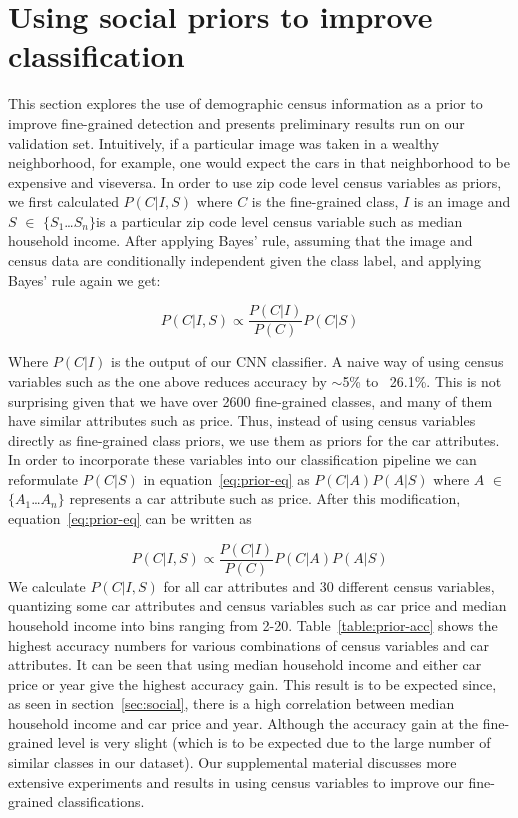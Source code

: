 \documentclass[10pt,twocolumn,letterpaper]{article}
\begin{document}
\section{Using social priors to improve classification}
\label{sec:prior}
This section explores the use of demographic census information as a prior to improve fine-grained detection and presents preliminary results run on our validation set. Intuitively, if a particular image was taken in a wealthy neighborhood, for example, one would expect the cars in that neighborhood to be expensive and viseversa. In order to use zip code level census variables as priors, we first calculated \(P(C|I,S)\) where \(C\) is the fine-grained class, \(I\) is an image and \(S\) \(\in\) \(\{\)\(S_{1}\)\ldots \(S_{n}\)\(\}\)is a particular zip code level census variable such as median household income. After applying Bayes' rule, assuming that the image and census data are conditionally independent given the class label, and applying Bayes' rule again we get:

\begin{equation}
P(C|I,S)\propto \frac{P(C|I)}{P(C)}P(C|S)
\label{eq:prior-eq}
\end{equation}

Where \(P(C|I)\) is the output of our CNN classifier. A naive way of using census variables such as the one above reduces accuracy by \(\sim\)5\% to ~26.1\%. This is not surprising given that we have over 2600 fine-grained classes, and many of them have similar attributes such as price. Thus, instead of using census variables directly as fine-grained class priors, we use them as priors for the car attributes. In order to incorporate these variables into our classification pipeline we can reformulate \(P(C|S)\) in equation~\ref{eq:prior-eq} as \(P(C|A)\)\(P(A|S)\) where \(A\) \(\in\) \(\{\)\(A_{1}\)\ldots\(A_{n}\)\(\}\) represents a car attribute such as price. After this modification, equation~\ref{eq:prior-eq} can be written as  

\begin{equation}
  P(C|I,S) \propto \frac{P(C|I)}{P(C)}P(C|A)P(A|S)
\end{equation}
We calculate \(P(C|I,S)\) for all car attributes and 30 different census variables, quantizing some car attributes and census variables such as car price and median household income into bins ranging from 2-20. Table~\ref{table:prior-acc} shows the highest accuracy numbers for various combinations of census variables and car attributes. It can be seen that using median household income and either car price or year give the highest accuracy gain. This result is to be expected since, as seen in section~\ref{sec:social}, there is a high correlation between median household income and car price and year. Although the accuracy gain at the fine-grained level is very slight (which is to be expected due to the large number of similar classes in our dataset). Our supplemental material discusses more extensive experiments and results in using census variables to improve our fine-grained classifications.
\end{document}
